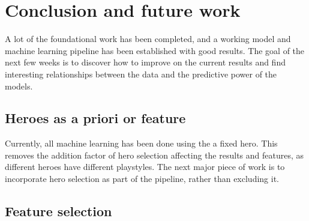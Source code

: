 \documentclass{../sty/SizheArticle}
\begin{document}
\section{Conclusion and future work}
A lot of the foundational work has been completed, and a working model and machine learning pipeline has been established with good results. The goal of the next few weeks is to discover how to improve on the current results and find interesting relationships between the data and the predictive power of the models. 

\subsection{Heroes as a priori or feature}
Currently, all machine learning has been done using the a fixed hero. This removes the addition factor of hero selection affecting the results and features, as different heroes have different playstyles. The next major piece of work is to incorporate hero selection as part of the pipeline, rather than excluding it. 

\subsection{Feature selection}


\printbibliography
\end{document}
